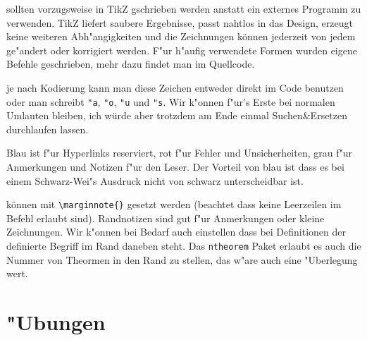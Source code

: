 \documentclass[paper=A4, twoside, chapterprefix=true, bibliography=totoc, headsepline]{scrbook}
\renewcommand{\thesection}{\arabic{section}}
\renewcommand*{\sectionmarkformat}{\thesection\autodot\enskip}
\begin{document}
\begin{description}[font=\normalfont\itshape]
\item[Zeichungen:]
	sollten vorzugsweise in TikZ gschrieben werden anstatt ein externes Programm zu verwenden. TikZ liefert saubere Ergebnisse, passt nahtlos in das Design, erzeugt keine weiteren Abh"angigkeiten und die Zeichnungen können jederzeit von jedem ge"andert oder korrigiert werden. F"ur h"aufig verwendete Formen wurden eigene Befehle geschrieben, mehr dazu findet man im Quellcode.
\item[Umlaute und "s:]
	je nach Kodierung kann man diese Zeichen entweder direkt im Code benutzen oder man schreibt \verb|"a|, \verb|"o|, \verb|"u| und \verb|"s|. Wir k"onnen f"ur's Erste bei normalen Umlauten bleiben, ich würde aber trotzdem am Ende einmal Suchen\&Ersetzen durchlaufen lassen.
\item[Farben:]
	Blau ist f"ur Hyperlinks reserviert, rot f"ur Fehler und Unsicherheiten, grau f"ur Anmerkungen und Notizen f"ur den Leser. Der Vorteil von blau ist dass es bei einem Schwarz-Wei"s Ausdruck nicht von schwarz unterscheidbar ist.
\item[Randnotizen:]
	können mit \verb|\marginnote{}| gesetzt werden (beachtet dass keine Leerzeilen im Befehl erlaubt sind). Randnotizen sind gut f"ur Anmerkungen oder kleine Zeichnungen. Wir k"onnen bei Bedarf auch einstellen dass bei Definitionen der definierte Begriff im Rand daneben steht. Das \verb|ntheorem| Paket erlaubt es auch die Nummer von Theormen in den Rand zu stellen, das w"are auch eine "Uberlegung wert.
\end{description}









\appendix


\chapter{"Ubungen}

\renewcommand*{\othersectionlevelsformat}[3]{\ifstr{#1}{section}{\"Ubung\ #3\ vom\ }{#3\autodot\enskip}}

\end{document}
